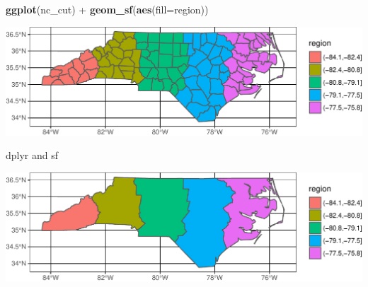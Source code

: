 \documentclass[11pt,ignorenonframetext,]{beamer}
\newenvironment{Shaded}{}{}
\newcommand{\DataTypeTok}[1]{\textcolor[rgb]{0.56,0.13,0.00}{#1}}
\newcommand{\KeywordTok}[1]{\textcolor[rgb]{0.00,0.44,0.13}{\textbf{#1}}}
\newcommand{\NormalTok}[1]{#1}
\newcommand{\OperatorTok}[1]{\textcolor[rgb]{0.40,0.40,0.40}{#1}}
\newcommand{\StringTok}[1]{\textcolor[rgb]{0.25,0.44,0.63}{#1}}
\let\oldShaded\Shaded
\let\endoldShaded\endShaded
\renewenvironment{Shaded}{\footnotesize\begin{spacing}{0.9}\oldShaded}{\endoldShaded\end{spacing}}
\let\oldverbatim\verbatim
\let\endoldverbatim\endverbatim
\newcommand{\scriptoutput}{
  \renewenvironment{Shaded}{\scriptsize\begin{spacing}{0.9}\oldShaded}{\endoldShaded\end{spacing}}
  \renewenvironment{verbatim}{\scriptsize\begin{spacing}{0.9}\oldverbatim}{\endoldverbatim\end{spacing}}
}
\begin{document}
\begin{frame}[fragile,t]{}
\protect\hypertarget{section-3}{}

\scriptoutput

\begin{Shaded}
\begin{Highlighting}[]
\KeywordTok{ggplot}\NormalTok{(nc_cut) }\OperatorTok{+}
\StringTok{  }\KeywordTok{geom_sf}\NormalTok{(}\KeywordTok{aes}\NormalTok{(}\DataTypeTok{fill=}\NormalTok{region))}
\end{Highlighting}
\end{Shaded}

\begin{center}\includegraphics[width=\textwidth]{Lec16_files/figure-beamer/unnamed-chunk-25-1} \end{center}

\end{frame}

\begin{frame}[fragile,t]{dplyr and sf}
\protect\hypertarget{dplyr-and-sf}{}

\scriptoutput

\begin{Shaded}
\end{Shaded}

\begin{center}\includegraphics[width=\textwidth]{Lec16_files/figure-beamer/unnamed-chunk-26-1} \end{center}

\end{frame}
\end{document}
